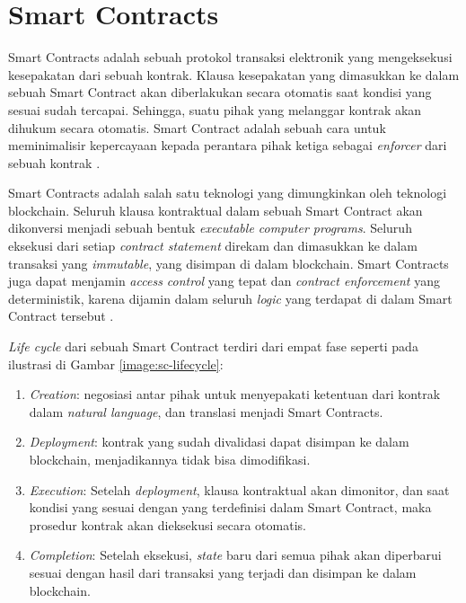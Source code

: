\section{Smart Contracts}
\label{sec:smart-contract}

Smart Contracts adalah sebuah protokol transaksi elektronik yang mengeksekusi kesepakatan dari sebuah kontrak. Klausa kesepakatan yang dimasukkan ke dalam sebuah Smart Contract akan diberlakukan secara otomatis saat kondisi yang sesuai sudah tercapai. Sehingga, suatu pihak yang melanggar kontrak akan dihukum secara otomatis. Smart Contract adalah sebuah cara untuk meminimalisir kepercayaan kepada perantara pihak ketiga sebagai \textit{enforcer} dari sebuah kontrak \parencite{szabo1997formalizing}.

Smart Contracts adalah salah satu teknologi yang dimungkinkan oleh teknologi blockchain. Seluruh klausa kontraktual dalam sebuah Smart Contract akan dikonversi menjadi sebuah bentuk \textit{executable computer programs}. Seluruh eksekusi dari setiap \textit{contract statement} direkam dan dimasukkan ke dalam transaksi yang \textit{immutable}, yang disimpan di dalam blockchain. Smart Contracts juga dapat menjamin \textit{access control} yang tepat dan \textit{contract enforcement} yang deterministik, karena dijamin dalam seluruh \textit{logic} yang terdapat di dalam Smart Contract tersebut \parencite{zheng2020overview}.

\textit{Life cycle} dari sebuah Smart Contract terdiri dari empat fase seperti pada ilustrasi di Gambar \ref{image:sc-lifecycle}:

\begin{enumerate}
	\item \textit{Creation}: negosiasi antar pihak untuk menyepakati ketentuan dari kontrak dalam \textit{natural language}, dan translasi menjadi Smart Contracts.
	\item \textit{Deployment}: kontrak yang sudah divalidasi dapat disimpan ke dalam blockchain, menjadikannya tidak bisa dimodifikasi.
	\item \textit{Execution}: Setelah \textit{deployment}, klausa kontraktual akan dimonitor, dan saat kondisi yang sesuai dengan yang terdefinisi dalam Smart Contract, maka prosedur kontrak akan dieksekusi secara otomatis.
	\item \textit{Completion}: Setelah eksekusi, \textit{state} baru dari semua pihak akan diperbarui sesuai dengan hasil dari transaksi yang terjadi dan disimpan ke dalam blockchain. 
\end{enumerate}

